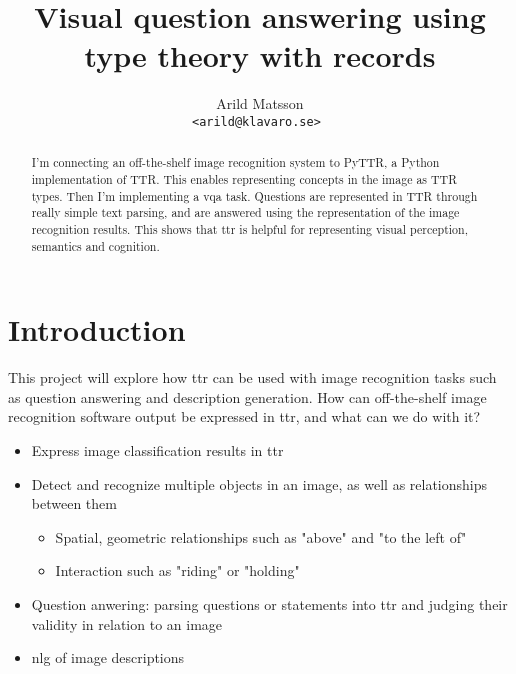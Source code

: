 \documentclass[11pt,a4paper]{article}
\begin{document}
\title{Visual question answering using type theory with records}

\author{Arild Matsson \\
  \small\tt <arild@klavaro.se>
}

\date{}


\maketitle

\noindent

\begin{abstract}

I'm connecting an off-the-shelf image recognition system to PyTTR, a Python implementation of TTR.
This enables representing concepts in the image as TTR types.
Then I'm implementing a \gls{vqa} task.
Questions are represented in TTR through really simple text parsing, and are answered using the representation of the image recognition results.
This shows that \gls{ttr} is helpful for representing visual perception, semantics and cognition.
\glsresetall
\end{abstract}

\section{Introduction}

This project will explore how \gls{ttr} can be used with image recognition tasks such as question answering and description generation.
How can off-the-shelf image recognition software output be expressed in \gls{ttr}, and what can we do with it?

\begin{itemize}
\item Express image classification results in \gls{ttr}
\item Detect and recognize multiple objects in an image, as well as relationships between them
\begin{itemize}
\item Spatial, geometric relationships such as "above" and "to the left of"
\item Interaction such as "riding" or "holding"
\end{itemize}
\item Question anwering: parsing questions or statements into \gls{ttr} and judging their validity in relation to an image
\item \gls{nlg} of image descriptions
\end{itemize}
\end{document}
